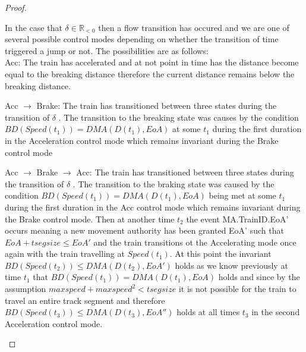 \begin{mytheorem}
\begin{proof}
\begin{description}
In the case that $\delta \in \mathbb{R}_{< 0}$ then a flow transition has occured and we are one of several
possible control modes depending on whether the transition of time triggered a jump or not.  The possibilities are as follows: \\

Acc: The train has accelerated and at not point in time has the distance become equal to the breaking distance therefore the current distance remains below the breaking distance. 


Acc $\to$ Brake: The train has transitioned between three states during the transition of $\delta$  . The transition to the breaking state was causes by the condition $BD(Speed(t_1)) = DMA(D(t_1), EoA)$ at some $t_1$ during the first duration in the Acceleration control mode which remains invariant during the Brake control mode 

Acc $\to$ Brake $\to$ Acc: The train has transitioned between three states during the transition of $\delta$  . The transition to the braking state was caused by the condition $BD(Speed(t_1)) = DMA(D(t_1), EoA)$ being met at some $t_1$ during the first duration in the Acc control mode which remains invariant during the Brake control mode. Then at another time $t_2$ the event MA.TrainID.EoA' occurs meaning a new movement authority has been granted EoA' such that $EoA + tsegsize \leq EoA'$ and the train transitions ot the Accelerating mode once again with the train travelling at $Speed(t_1)$.  At this point the invariant $BD(Speed(t_2)) \leq DMA(D(t_2), EoA')$ holds as we know previously at time $t_1$ that $BD(Speed(t_1)) = DMA(D(t_1), EoA)$ holds and since by the assumption $maxspeed + maxspeed^2 < tsegsize$ it is not possible for the train to travel an entire track segment and therefore $BD(Speed(t_3)) \leq DMA(D(t_3), EoA'')$ holds at all times $t_3$ in the second Acceleration control mode. 


\begin{comment}
 In the $Accelerating$ mode we have $\dot{Speed} = 1$ with $D(t) \leq BD(EoA, Speed) \leq  EoA$. There are two cases either $D(t) = BD(EoA,Speed)$ or $D(t) < BD(EoA,Speed)$.  In the case that $D(t) = BD(EoA,Speed)$  a jump occurs taking the system into the Braking mode
with $D(t_1) = BD(Speed,t_1) < EoA$. In the case that $D(t_1) < BD(Speed,t_1)$ time will progress and at some point in the future $t_2$ the train will with reach the braking point $D(t_2) = BD(Speed',t_2)$ or $Speed' = Max Speed \wedge (D(t_2) < BD(Speed', t_2)$.   In the case that $D(t_2) = BD(Speed', t_2)$ a jump will occur taking the train into the braking mode with $D(t_2) = BD(Speed',t_2) < EoA$. Otherwise $Speed = MaxSpeed$ and a jump is performed to the $Full Allowed Speed$ mode with $D(t_2) < BD(Speed', t_2) < EoA$.
\end{comment}


\end{description}
\end{proof}
\end{mytheorem}
